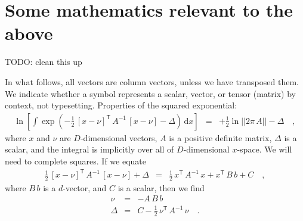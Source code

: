 \documentclass[manuscript, letterpaper]{aastex6}
\newcommand{\project}[1]{\textsl{#1}}
\newcommand{\acronym}[1]{{\small{#1}}}
\newcommand{\apogee}{\project{\acronym{APOGEE}}}
\newcommand{\dd}{\mathrm{d}}
\newcommand{\transp}[1]{{#1}^{\!\mathsf{T}}}
\newcommand{\inv}[1]{{#1}^{-1}}
\newcommand{\todo}[1]{{\color{red}TODO: #1}}
\begin{document}





\appendix

\section{Some mathematics relevant to the above} \label{sec:appendix}

\todo{clean this up}

In what follows, all vectors are column vectors, unless we have transposed them.
We indicate whether a symbol represents a scalar, vector, or tensor
(matrix) by context, not typesetting.
Properties of the squared exponential:
\begin{eqnarray}
  \ln\left[\int\exp(-\frac{1}{2}\,\transp{[x-\nu]}\,\inv{A}\,[x-\nu] - \Delta)\,\dd x\right]
  &=& +\frac{1}{2}\ln ||2\pi\,A|| -\Delta
  \quad ,
\end{eqnarray}
where $x$ and $\nu$ are $D$-dimensional vectors, $A$ is a positive definite
matrix, $\Delta$ is a scalar, and the integral is implicitly over all
of $D$-dimensional $x$-space.
We will need to complete squares.
If we equate
\begin{eqnarray}
  \frac{1}{2}\,\transp{[x-\nu]}\,\inv{A}\,[x-\nu] + \Delta
  &=& \frac{1}{2}\,\transp{x}\,\inv{A}\,x + \transp{x}\,B\,b + C
  \quad ,
\end{eqnarray}
where $B\,b$ is a $d$-vector, and $C$ is a scalar, then we find
\begin{eqnarray}
  \nu &=& -A\,B\,b
  \\
  \Delta & = & C - \frac{1}{2}\,\transp{\nu}\,\inv{A}\,\nu
  \quad .
\end{eqnarray}
\end{document}
